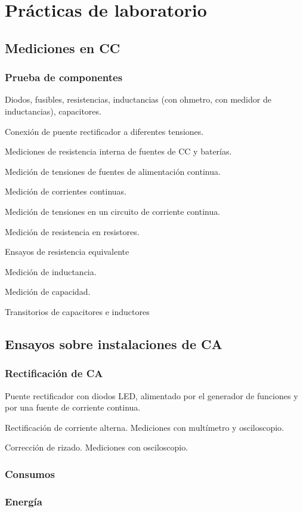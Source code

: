 \chapter{Prácticas de laboratorio}

\section{Mediciones en CC}
\subsection{Prueba de componentes}
Diodos, fusibles, resistencias, inductancias (con ohmetro, con medidor de inductancias), capacitores.

Conexión de puente rectificador a diferentes tensiones.

Mediciones de resistencia interna de fuentes de CC y baterías.

Medición de tensiones de fuentes de alimentación continua.

Medición de corrientes continuas.

Medición de tensiones en un circuito de corriente continua.

Medición de resistencia en resistores.

Ensayos de resistencia equivalente


Medición de inductancia.

Medición de capacidad.

Transitorios de capacitores e inductores

\section{Ensayos sobre instalaciones de CA}
\subsection{Rectificación de CA}
Puente rectificador con diodos LED, alimentado por el generador de funciones y por una fuente de corriente continua.

Rectificación de corriente alterna. Mediciones con multímetro y osciloscopio.

Corrección de rizado. Mediciones con osciloscopio.

\subsection{Consumos}
\subsection{Energía}
